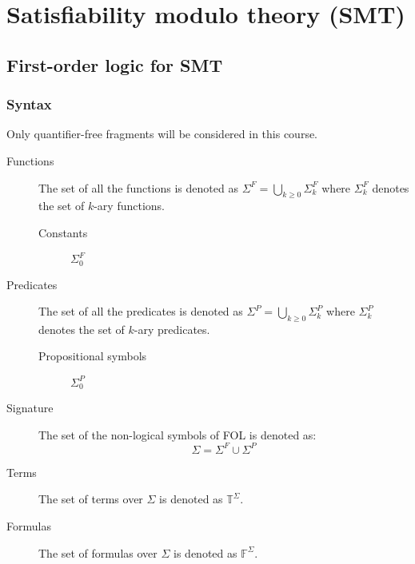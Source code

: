 \chapter{Satisfiability modulo theory (SMT)}


\section{First-order logic for SMT}


\subsection{Syntax}

\begin{remark}
    Only quantifier-free fragments will be considered in this course.
\end{remark}

\begin{description}
    \item[Functions] 
        The set of all the functions is denoted as $\Sigma^F = \bigcup_{k \geq 0} \Sigma^F_k$
        where $\Sigma^F_k$ denotes the set of $k$-ary functions.

        \begin{description}
            \item[Constants] $\Sigma^F_0$
        \end{description}

    \item[Predicates] 
        The set of all the predicates is denoted as $\Sigma^P = \bigcup_{k \geq 0} \Sigma^P_k$
        where $\Sigma^P_k$ denotes the set of $k$-ary predicates.

        \begin{description}
            \item[Propositional symbols] $\Sigma^P_0$
        \end{description}

    \item[Signature] 
        The set of the non-logical symbols of FOL is denoted as:
        \[ \Sigma = \Sigma^F \cup \Sigma^P \]

    \item[Terms] 
        The set of terms over $\Sigma$ is denoted as $\mathbb{T}^\Sigma$.

    \item[Formulas] 
        The set of formulas over $\Sigma$ is denoted as $\mathbb{F}^\Sigma$.
\end{description}


